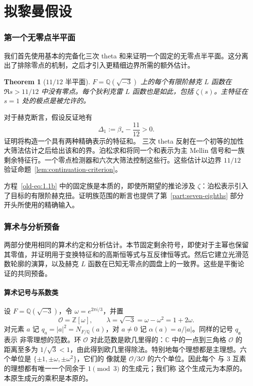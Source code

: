 \documentclass[11pt,a4paper]{article}
\numberwithin{equation}{section}
\numberwithin{figure}{section}
\newtheorem{theorem}{Theorem}[section]
\theoremstyle{definition}
\theoremstyle{remark}
\begin{document}
\clearpage
\part{拟黎曼假设}
\label{part:eleven-twelfths}

\section{第一个无零点半平面}
\label{sec:first-stage}

我们首先使用基本的完备化三次 theta 和来证明一个固定的无零点半平面。这分离出了排除零点的机制，之后才引入更精细边界所需的额外估计。

\begin{theorem}[$11/12$ 半平面]
\label{thm:eleven-twelfths}
$F=\mathbb Q(\sqrt{-3})$ 上的每个有限阶赫克 $L$ 函数在 $\Re s>11/12$ 中没有零点。每个狄利克雷 $L$ 函数也是如此，包括 $\zeta(s)$。主特征在 $s=1$ 处的极点是被允许的。
\end{theorem}

对于赫克断言，假设反证地有
\begin{equation}
 \Delta_1:=\beta_*-\frac{11}{12}>0.
 \label{eq:first-stage-gap}
\end{equation}
证明将构造一个具有两种精确表示的特征和。
三次 theta 反射在一个初等的加性大筛法估计之后给出该和的界。泊松求和将同一个和表示为主 Mellin 信号和一族剩余特征行。一个零点检测器和六次大筛法控制这些行。这些估计以边界 $11/12$ 验证命题~\ref{lem:continuation-criterion}。

方程~\eqref{old-eq:1.1b} 中的固定族是本质的，即使所期望的推论涉及 $\zeta$：泊松表示引入了目标的有限阶赫克扭。证明族范围的断言也提供了第~\ref{part:seven-eighths} 部分开头所使用的精确输入。

\section{算术与分析预备}\label{sec:arithmetic}

两部分使用相同的算术约定和分析估计。本节固定剩余符号，即使对于主幂也保留其零值，并证明用于变换特征和的高斯恒等式与互反律恒等式。然后它建立光滑范数轮廓的演算，以及赫克 $L$ 函数在已知无零点的圆盘上的一致界。这些是平衡论证的共同预备。

\subsection{算术记号与系数类}设 $F=\mathbb Q(\sqrt{-3})$，令
$\omega=e^{2\pi i/3}$，并置
\[
 \mathcal O=\mathbb Z[\omega],\qquad
 \lambda=\sqrt{-3}=\omega-\omega^2=1+2\omega.
\]
对元素 $a$ 记 $q_a=|a|^2=N_{F/\mathbb Q}(a)$，对 $a\ne0$
记 $\alpha(a)=a/|a|$。同样的记号 $q_{\mathfrak a}$ 表示
非零理想的范数。环 $\mathcal O$ 对此范数是欧几里得的：$\mathbb C$ 中的一点到三角格
$\mathcal O$ 的距离至多为 $1/\sqrt3<1$，由此得到欧几里得除法。特别地每个理想都是主理想。六个单位是 $\{\pm1,\pm\omega,\pm\omega^2\}$，它们的
像就是 $\mathcal O/3\mathcal O$ 的六个单位。因此每个
与 $3$ 互素的理想都有唯一一个同余于 $1\pmod3$ 的生成元；我们称
这个生成元为本原的。本原生成元的乘积是本原的。
\end{document}
